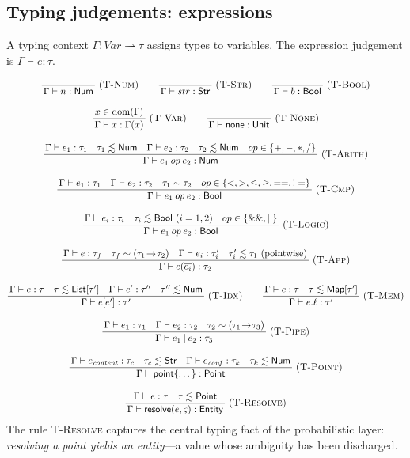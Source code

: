 \documentclass[11pt,a4paper]{article}
\theoremstyle{plain}
\theoremstyle{definition}
\theoremstyle{remark}
\newcommand{\rn}[1]{\textsc{#1}}                          %
\DeclareMathOperator{\dom}{dom}                           %
\newcommand{\consistent}{\sim}
\newcommand{\Gam}{\Gamma}
\newcommand{\Strat}{\varsigma}
\newcommand{\infrule}[3]{%
  \ensuremath{\displaystyle\frac{\,#2\,}{\,#3\,}}\;\rn{(#1)}}
\newcommand{\jspace}{\qquad}
\begin{document}
\subsection{Typing judgements: expressions}

A typing context $\Gam\colon\mathit{Var}\rightharpoonup\tau$ assigns types to
variables. The expression judgement is $\Gam\vdash e:\tau$.

\begin{gather*}
\infrule{T-Num}{}{\Gam\vdash n:\mathsf{Num}} \jspace
\infrule{T-Str}{}{\Gam\vdash str:\mathsf{Str}} \jspace
\infrule{T-Bool}{}{\Gam\vdash b:\mathsf{Bool}} \\[10pt]
\infrule{T-Var}{x\in\dom(\Gam)}{\Gam\vdash x:\Gam(x)} \jspace
\infrule{T-None}{}{\Gam\vdash \mathsf{none}:\mathsf{Unit}}\\[10pt]
\infrule{T-Arith}{\Gam\vdash e_1:\tau_1 \quad \tau_1\lesssim\mathsf{Num}\quad
                  \Gam\vdash e_2:\tau_2 \quad \tau_2\lesssim\mathsf{Num}\quad
                  op\in\{+,-,*,/\}}
                 {\Gam\vdash e_1\mathbin{op}e_2:\mathsf{Num}}\\[10pt]
\infrule{T-Cmp}{\Gam\vdash e_1:\tau_1\quad\Gam\vdash e_2:\tau_2\quad
                \tau_1\consistent\tau_2\quad op\in\{<,>,\le,\ge,==,!=\}}
               {\Gam\vdash e_1\mathbin{op}e_2:\mathsf{Bool}}\\[10pt]
\infrule{T-Logic}{\Gam\vdash e_i:\tau_i\quad\tau_i\lesssim\mathsf{Bool}\
                  (i=1,2)\quad op\in\{\&\&,||\}}
                 {\Gam\vdash e_1\mathbin{op}e_2:\mathsf{Bool}}\\[10pt]
\infrule{T-App}{\Gam\vdash e:\tau_f\quad \tau_f\consistent
                (\tau_1\!\to\!\tau_2)\quad \Gam\vdash e_i:\tau_i'\quad
                \tau_i'\lesssim\tau_1\ \text{(pointwise)}}
               {\Gam\vdash e(\overline{e_i}):\tau_2}\\[10pt]
\infrule{T-Idx}{\Gam\vdash e:\tau\quad \tau\lesssim\mathsf{List}[\tau']\quad
                \Gam\vdash e':\tau''\quad\tau''\lesssim\mathsf{Num}}
               {\Gam\vdash e[e']:\tau'} \jspace
\infrule{T-Mem}{\Gam\vdash e:\tau\quad \tau\lesssim\mathsf{Map}[\tau']}
              {\Gam\vdash e.\ell:\tau'}\\[10pt]
\infrule{T-Pipe}{\Gam\vdash e_1:\tau_1\quad\Gam\vdash e_2:\tau_2\quad
                 \tau_2\consistent(\tau_1\!\to\!\tau_3)}
                {\Gam\vdash e_1\mathbin{|}e_2:\tau_3}\\[10pt]
\infrule{T-Point}{\Gam\vdash e_{\mathit{content}}:\tau_c\quad
                  \tau_c\lesssim\mathsf{Str}\quad
                  \Gam\vdash e_{\mathit{conf}}:\tau_k\quad
                  \tau_k\lesssim\mathsf{Num}}
                 {\Gam\vdash \mathsf{point}\{\dots\}:\mathsf{Point}}\\[10pt]
\infrule{T-Resolve}{\Gam\vdash e:\tau\quad\tau\lesssim\mathsf{Point}}
                   {\Gam\vdash \mathsf{resolve}(e,\Strat):\mathsf{Entity}}
\end{gather*}
The rule \rn{T-Resolve} captures the central typing fact of the probabilistic
layer: \emph{resolving a point yields an entity}---a value whose ambiguity has
been discharged.
\end{document}
